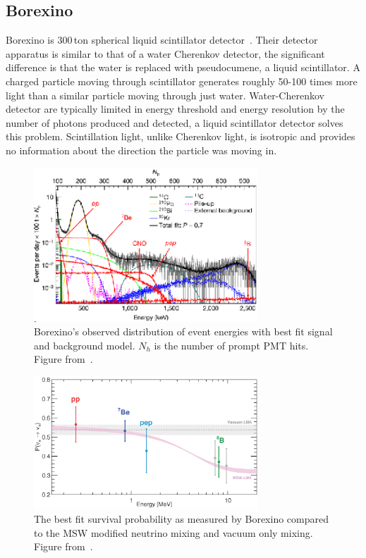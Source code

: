 \subsection{Borexino}
Borexino is 300\,ton spherical liquid scintillator detector~\cite{borexino_tdr}. Their detector
apparatus is similar to that of a water Cherenkov detector, the significant difference
is that the water is replaced with pseudocumene, a liquid scintillator.
A charged particle moving through scintillator generates roughly 50-100 times
more light than a similar particle moving through just water.
Water-Cherenkov detector are typically limited in energy threshold
and energy resolution by the number of photons produced and detected, a liquid scintillator
detector solves this problem.  Scintillation light, unlike Cherenkov light,
is isotropic and provides no information about the direction the particle
was moving in.
\begin{figure}[htbp]
    \centering
    \includegraphics[width=0.75\textwidth]{borexino_spectrum}
    \caption[Borexino Spectrum] {Borexino's observed distribution of event energies with best fit
    signal and background model.
    $N_{h}$ is the number of prompt PMT hits.  Figure from~\cite{borexino_nature}.} %
\label{fig:borexino_spectrum}
\end{figure}
\begin{figure}[htbp]
    \centering
    \includegraphics[width=0.75\textwidth]{borexino_pee}
    \caption[Borexino Survival Probability] {The best fit survival probability
    as measured by Borexino compared to the MSW modified neutrino mixing
    and vacuum only mixing. Figure from~\cite{borexino_nature}.}
\label{fig:borexino_pee}
\end{figure}

